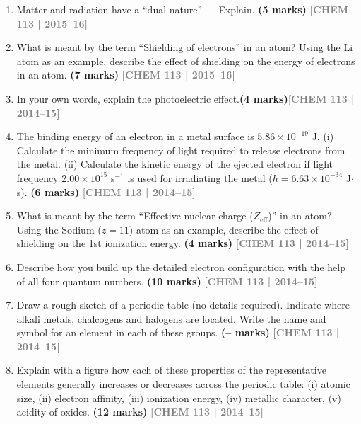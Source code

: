 \documentclass[12pt,a3paper]{article}
\newcommand{\yr}[1]{\hfill\textcolor{gray}{\small\textbf{[#1]}}}
\newcommand{\mk}[1]{\textcolor{orange!70!black}{\small\textbf{(#1 marks)}}}
\begin{document}
\begin{enumerate}
\item Matter and radiation have a ``dual nature'' --- Explain. \mk{5}
\yr{CHEM 113 | 2015--16}



\item What is meant by the term ``Shielding of electrons'' in an atom? Using the Li atom as an example, describe the effect of shielding on the energy of electrons in an atom. \mk{7}
\yr{CHEM 113 | 2015--16}



\item In your own words, explain the photoelectric effect.\mk{4}\yr{CHEM 113 | 2014--15}



\item The binding energy of an electron in a metal surface is $5.86 \times 10^{-19}$ J. (i) Calculate the minimum frequency of light required to release electrons from the metal. (ii) Calculate the kinetic energy of the ejected electron if light frequency $2.00 \times 10^{15}$ s$^{-1}$ is used for irradiating the metal ($h = 6.63 \times 10^{-34}$ J$\cdot$s). \mk{6}
\yr{CHEM 113 | 2014--15}



\item What is meant by the term ``Effective nuclear charge ($Z_{\text{eff}}$)'' in an atom? Using the Sodium ($z = 11$) atom as an example, describe the effect of shielding on the 1st ionization energy. \mk{4}
\yr{CHEM 113 | 2014--15}



\item Describe how you build up the detailed electron configuration with the help of all four quantum numbers. \mk{10}
\yr{CHEM 113 | 2014--15}



\item Draw a rough sketch of a periodic table (no details required). Indicate where alkali metals, chalcogens and halogens are located. Write the name and symbol for an element in each of these groups. \mk{--}
\yr{CHEM 113 | 2014--15}



\item Explain with a figure how each of these properties of the representative elements generally increases or decreases across the periodic table: (i) atomic size, (ii) electron affinity, (iii) ionization energy, (iv) metallic character, (v) acidity of oxides. \mk{12}
\yr{CHEM 113 | 2014--15}




\end{enumerate}
\end{document}
